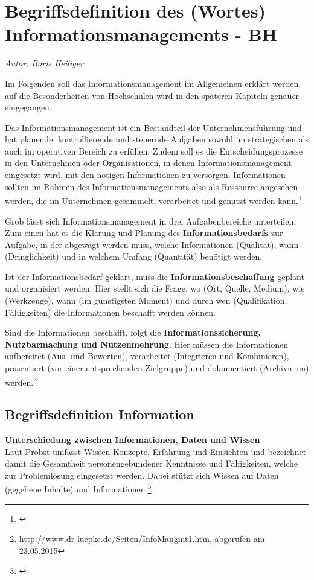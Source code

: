 \section{Begriffsdefinition des (Wortes) Informationsmanagements - BH}
\textit{Autor: Boris Heiliger}

Im Folgenden soll das Informationsmanagement im Allgemeinen erklärt werden, auf die Besonderheiten von Hochschulen wird in den späteren Kapiteln genauer eingegangen.

Das Informationsmanagement ist ein Bestandteil der Unternehmensführung und hat planende, kontrollierende und steuernde Aufgaben sowohl im strategischen als auch im operativen Bereich zu erfüllen. Zudem soll es die Entscheidungsprozesse in den Unternehmen oder Organisationen, in denen Informationsmanagement eingesetzt wird, mit den nötigen Informationen zu versorgen. Informationen sollten im Rahmen des Informationsmanagements also als Ressource angesehen werden, die im Unternehmen gesammelt, verarbeitet und genutzt werden kann.\footnote{\cite[65-68]{voss_informationsmanagement_2001}}

Grob lässt sich Informationsmanagement in drei Aufgabenbereiche unterteilen. Zum einen hat es die Klärung und Planung des \textbf{Informationsbedarfs} zur Aufgabe, in der abgewägt werden muss, welche Informationen (Qualität), wann (Dringlichkeit) und in welchem Umfang (Quantität) benötigt werden.

Ist der Informationsbedarf geklärt, muss die \textbf{Informationsbeschaffung} geplant 
und organisiert werden. Hier stellt sich die Frage, wo (Ort, Quelle, Medium), wie (Werkzeuge), wann (im günstigsten Moment) und durch wen (Qualifikation, Fähigkeiten) die Informationen beschafft werden können.

Sind die Informationen beschafft, folgt die \textbf{Informationssicherung, Nutzbarmachung und Nutzenmehrung}. Hier müssen die Informationen aufbereitet (Aus- und Bewerten), verarbeitet (Integrieren und Kombinieren), präsentiert (vor einer entsprechenden Zielgruppe) und dokumentiert (Archivieren) werden.\footnote{\url{http://www.dr-luepke.de/Seiten/InfoMangmt1.htm}, abgerufen am 23.05.2015}

\subsection{Begriffsdefinition Information}

\textbf{Unterschiedung zwischen Informationen, Daten und Wissen}\\
Laut Probst umfasst Wissen Konzepte, Erfahrung und Einsichten und bezeichnet damit die Gesamtheit personengebundener Kenntnisse und Fähigkeiten, welche zur Problemlösung eingesetzt werden. Dabei stützt sich Wissen auf Daten (gegebene Inhalte) und Informationen.\footnote{\cite{probst_wissen_2006}}

